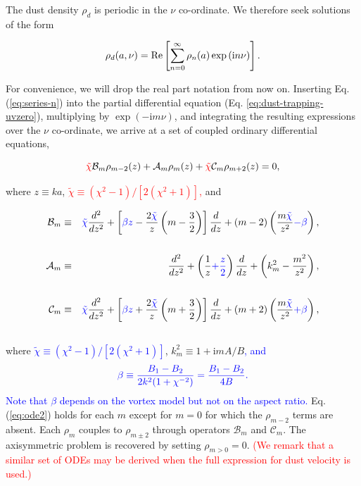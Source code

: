 \documentclass[apj]{emulateapj}
\def\blue#1{\textcolor{blue}{#1}}
\def\red#1{\textcolor{red}{#1}}
\newcommand{\Eq}[1]{Eq. (\ref{#1})}
\newcommand{\eq}[1]{\Eq{#1}}
\newcommand{\eqp}[1]{(Eq. \ref{#1})}
\newcommand{\beq}{\begin{equation}}
\newcommand{\eeq}{\end{equation}}
\newcommand{\beqn}{\begin{eqnarray}}
\newcommand{\eeqn}{\end{eqnarray}}
\newcommand{\tilchi}{\tilde\chi}
\begin{document}
The dust density $\rho_d$ is periodic in the $\nu$ co-ordinate. We 
therefore seek solutions of the form

\beq\label{eq:series-n}
\rho_d(a,\nu) = {\rm Re}
\left[\sum_{n=0}^\infty\rho_n(a)\exp{\left(\mathrm{i}n\nu\right)} \right].
\eeq

For convenience, we will drop the real part notation from now on. Inserting
\eq{eq:series-n} into the partial differential equation \eqp{eq:dust-trapping-uvzero},
multiplying by $\exp{(-\mathrm{i}m\nu)}$, and integrating the resulting
expressions over the $\nu$ co-ordinate, we arrive at a set of coupled
ordinary differential equations, 

\blue{
\beq\label{eq:ode2}
\red{\tilchi}\mathcal{B}_m\rho_{m-2} (z)+ \mathcal{A}_m\rho_m(z) + \red{\tilchi}\mathcal{C}_m\rho_{m+2}(z) = 0,
\eeq
}

where $z\equiv ka$, \red{$\tilchi\equiv(\chi^2-1)/[2(\chi^2+1)]$,} and

\beqn
\mathcal{B}_m &\equiv& \blue{\tilchi}\frac{d^2}{dz^2} + \left[\blue{\beta z}-
  \frac{2\blue{\tilchi}}{z}
  \left(m-\frac{3}{2}\right)\right]\frac{d}{dz}+\left(m-2\right)\left(\frac{m\blue{\tilchi}}{z^2}\blue{-\beta}\right), \notag\\
&&\label{eq:ops}\\ 
\mathcal{A}_m&\equiv&\frac{d^2}{dz^2} +\left(\frac{1}{z}\blue{+\frac{z}{2}}\right)\frac{d}{dz} +\left(k_m^2-\frac{m^2}{z^2}\right),\\
%
&&\notag\\
\mathcal{C}_m &\equiv& \blue{\tilchi}\frac{d^2}{dz^2}
+\left[\blue{\beta z} +
  \frac{2\blue{\tilchi}}{z}\left(m+\frac{3}{2}\right)\right]\frac{d}{dz}
+ \left(m+2\right)\left(\frac{m\blue{\tilchi}}{z^2}
  \blue{+\beta}\right),\notag\\
&&\label{eq:opsw}
\eeqn
where \blue{$\tilchi\equiv(\chi^2-1)/[2(\chi^2+1)]$}, $k_m^2 \equiv 1+\mathrm{i}mA/B$\blue{, and}
\beq
\blue{\beta \equiv \frac{B_1-B_2}{2k^2(1+\chi^{-2})} = \frac{B_1 - B_2}{4B}.}
\eeq
\blue{Note that $\beta$ depends on the vortex model but not on the
  aspect ratio.} \eq{eq:ode2} holds for each $m$ except for $m=0$ for which the $\rho_{m-2}$ terms are absent. Each 
$\rho_m$ couples to $\rho_{m\pm2}$ through operators $\mathcal{B}_m$
and $\mathcal{C}_m$. The axisymmetric problem is recovered by
setting $\rho_{m>0}=0$. \red{(We remark that a similar set of ODEs may be derived when the full expression for dust velocity is used.)}
\end{document}
